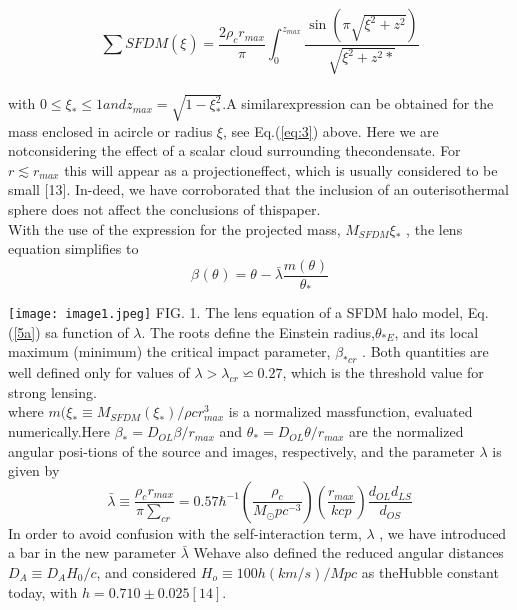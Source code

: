 \documentclass[10pt,a4paper]{article}
\begin{document}
\begin{multicols}{2}
\begin{equation}\label{eq:4} 
	\sum SFDM(\xi_{}) = \frac{2 \rho_{c} r_{max}}{\pi} \int_{0}^{z_{max}}\frac{\sin(\pi \sqrt{\xi^{2}{}+z^{2}{}})}{\sqrt{\xi^{2}{}+z^{2}{*}}} 
\end{equation}\\
with $ 0 \leq \xi_{*} \leq 1 and z_{max} = \sqrt{1-\xi^{2}_{*}}$.A  similarexpression  can  be  obtained  for  the  mass  enclosed  in  acircle  or  radius $\xi$, see Eq.(\ref{eq:3}) above.   Here  we  are  notconsidering the effect of a scalar cloud surrounding thecondensate.  For $r \lesssim r_{max}$ this will appear as a projectioneffect,  which is usually considered to be small [13].  In-deed, we have corroborated that the inclusion of an outerisothermal sphere does not affect the conclusions of thispaper.\\
With the use of the expression for the projected mass, $M_{SFDM} \xi_{*}$ , the lens equation simplifies to \\
\begin{equation}\label{5a}
	\beta_{}(\theta_{})=\theta_{}-\bar{\lambda} \frac{m(\theta_{})}{\theta_{*}}
\end{equation}
\graphicspath{ {images/} } 
 \texttt{[image: image1.jpeg]} 
 \label{fig:1}
FIG. 1.  The lens equation of a SFDM halo model, Eq. (\ref{5a}) sa function of $\lambda$.  The roots define the Einstein radius,$\theta_{*E}$, and its local maximum (minimum) the critical impact parameter, $\beta_{*cr}$ .  Both quantities are well defined only for values of $\lambda > \lambda_{cr} \backsimeq 0.27$, which is the threshold value for strong lensing.\\
where $m( \xi_{*} \equiv M _{SFDM} (\xi_{*}) / \rho c r^{3}_{max}$ is a normalized massfunction, evaluated numerically.Here $\beta_{*} = D_{OL} \beta / r_{max}$ and $\theta_{*} = D_{OL} \theta / r_{max}$ are  the  normalized  angular  posi-tions of the source and images, respectively, and the parameter $\lambda$ is given by
\begin{equation}\tag{5b}
	\bar{\lambda}\equiv\frac{\rho_{c}r_{max}}{\pi\sum_{cr}}=0.57\hbar^{-1}(\frac{\rho_{c}}{M_{\odot}pc^{-3}})(\frac{r_{max}}{kcp})\frac{d_{OL}d_{LS}}{d_{OS}} 
\end{equation}
In order to avoid confusion with the self-interaction term, $\lambda$ , we have introduced a bar in the new parameter $\bar{\lambda}$ Wehave  also  defined  the  reduced  angular  distances $D_{A} \equiv D_{A} H_{0} / c$, and considered $H_{o} \equiv 100h(km/s)/Mpc$ as theHubble constant today, with $h = 0.710 \pm 0.025 [14].$\\

\end{multicols}
\end{document}
